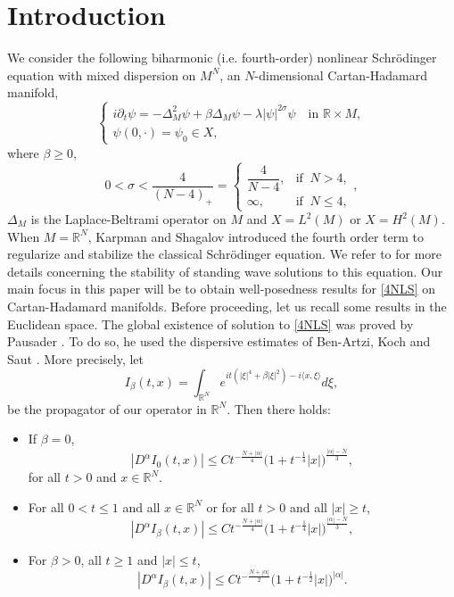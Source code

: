 \documentclass[10pt,leqno]{amsart}
\numberwithin{equation}{section}
\newcommand{\field}[1]{\mathbb{#1}}
\newcommand{\R}{\field{R}}          		%
\begin{document}
\section{Introduction}
We consider the following biharmonic (i.e. fourth-order) nonlinear Schr\"odinger equation with mixed dispersion on $M^N$, an $N$-dimensional Cartan-Hadamard manifold,
\begin{equation}\label{4NLS}
\begin{cases}
i\partial_t\psi =- \Delta_M^2 \psi +\beta\Delta_M \psi -\lambda |\psi|^{2\sigma}\psi \quad\text{in }\R\times M,\\
\psi(0,\cdot)=\psi_0\in X,
\end{cases}
\end{equation}
where $\beta \geq 0$, 
\[
0<\sigma <\dfrac{4}{(N-4)_+}=\begin{cases}\dfrac{4}{N-4},&\mbox{if }\  N>4,\\ \infty,&\mbox{if }\   N\leq 4, \end{cases},
\] 
 $\Delta_M$ is the Laplace-Beltrami operator on $M$ and $X=L^2 (M)$ or $X=H^2 (M)$. When $M=\R^N$, Karpman and Shagalov \cite{MR1779828} introduced the fourth order term to regularize and stabilize the classical Schr\" odinger equation. We refer to \cite{MR1898529,MR4001029,MR3855391} for more details concerning the stability of standing wave solutions to this equation. 
 Our main focus in this paper will be to obtain well-posedness results for \eqref{4NLS} on Cartan-Hadamard manifolds. Before proceeding, let us recall some results in the Euclidean space. The global existence of solution to \eqref{4NLS} was proved by Pausader \cite{MR2505703,MR2502523}. To do so, he used the dispersive estimates of Ben-Artzi, Koch and Saut \cite{MR1745182}. More precisely, let 
$$I_\beta (t,x)= \int_{\R^N} e^{it (|\xi|^4 +\beta |\xi|^2) -i \langle x ,\xi\rangle} d\xi, $$
be the propagator of our operator in $\R^N$. Then there holds:
\begin{itemize}
\item If $\beta=0$,
$$|D^\alpha I_0 (t,x)|\leq C t^{-\frac{N+|\alpha|}{4}} \big(1+ t^{-\frac{1}{4}}|x| \big)^{\frac{|\alpha|-N}{3}},$$
for all $t>0$ and $x\in \R^N$.
\item For all $0<t\leq 1$ and all $x\in \R^N$ or for all $t>0$ and all $|x|\geq t$,
$$|D^\alpha I_\beta (t,x)| \leq  C t^{-\frac{N+|\alpha|}{4}} \big(1+ t^{-\frac{1}{4}}|x| \big)^{\frac{|\alpha|-N}{3}} , $$
\item For $\beta>0$,  all $t\geq 1$ and $|x|\leq t$,
$$|D^\alpha I_{\beta} (t,x)| \leq C t^{-\frac{N+|\alpha|}{2}} \big(1+ t^{-\frac{1}{2}}|x| \big)^{|\alpha|} .$$
\end{itemize}
\end{document}
